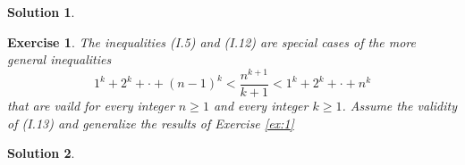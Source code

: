 \documentclass[11pt,a4paper]{book}
\newtheorem{exercise}{Exercise}
\newtheorem{solution}{Solution}
\begin{document}
\begin{solution}
\end{solution}
\vrule


\begin{exercise}
  The inequalities (I.5) and (I.12) are special cases of the more general inequalities
  \[
  \tag{I.13}  1^k + 2^k + \cdot + (n - 1)^k < \frac{n^{k+1}}{k+1} < 1^k + 2^k + \cdot + n^k
  \]
  that are vaild for every integer $n \ge 1$ and every integer $k \ge 1$. Assume the validity of (I.13) and generalize the results of Exercise \ref{ex:1}
\end{exercise}

\begin{solution}
\end{solution}
\end{document}
